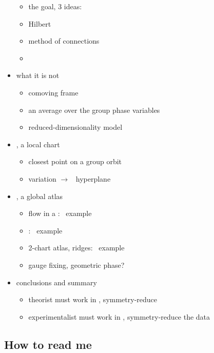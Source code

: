 \begin{itemize}
    \begin{itemize}
      \item the goal, 3 ideas:
      \item Hilbert
      \item method of connections
      \item \mslices
    \end{itemize}
  \item what it is not
    \begin{itemize}
      \item comoving frame
      \item an average over the group phase variables
      \item reduced-dimensionality model
    \end{itemize}
  \item \mslices, a local chart
    \begin{itemize}
      \item closest point on a group orbit
      \item variation $\to$ \slice\ hyperplane
    \end{itemize}
  \item \mslices, a global atlas
    \begin{itemize}
      \item flow in a \slice: \cLf\ example
      \item {\chartBord}: \cLf\ example
      \item 2-chart atlas, ridges:  \cLf\ example
      \item gauge fixing, geometric phase?
    \end{itemize}
  \item conclusions and summary
      \begin{itemize}
      \item theorist must work in \statesp, symmetry-reduce
      \item experimentalist must work in \statesp,
            symmetry-reduce the data
      \end{itemize}
\end{itemize}

\newpage


\subsection{How to read me}

